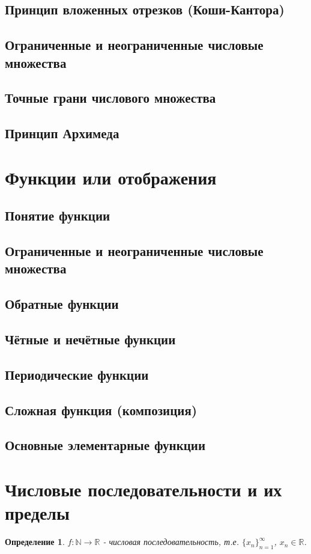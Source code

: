 \documentclass[a4paper,12pt]{article} %
\newtheorem{definition}{Определение}
\begin{document}
\subsection{Принцип вложенных отрезков (Коши-Кантора)}
\subsection{Ограниченные и неограниченные числовые множества}
\subsection{Точные грани числового множества}
\subsection{Принцип Архимеда}


\section{Функции или отображения}
\subsection{Понятие функции}
\subsection{Ограниченные и неограниченные числовые множества}
\subsection{Обратные функции}
\subsection{Чётные и нечётные функции}
\subsection{Периодические функции}
\subsection{Сложная функция (композиция)}
\subsection{Основные элементарные функции}

\section{Числовые последовательности и их пределы}
\begin{definition}
	$f:\mathbb{N}\rightarrow \mathbb{R}$ - числовая последовательность, т.е. $\{x_n\}_{n=1}^\infty$, $x_n \in \mathbb{R}$.
\end{definition}
\end{document}
